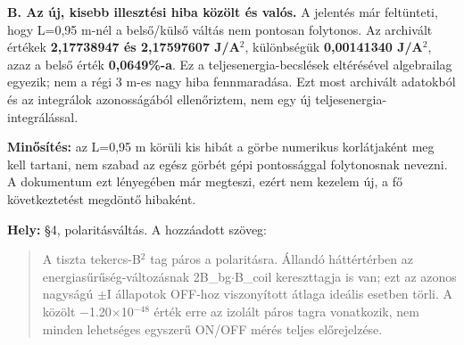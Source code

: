 \documentclass[10pt,a4paper]{article}
\begin{document}
{\begin{quote}
\end{quote}
\par

\newpage
{}\par\vspace{2pt}
\noindent{\color{navy}\rule{\linewidth}{0.4pt}}\par\vspace{2pt}
\textbf{B. Az új, kisebb illesztési hiba közölt és valós.} A jelentés már feltünteti, hogy L=0,95 m-nél a belső/külső váltás nem pontosan folytonos. Az archivált értékek \textbf{2,17738947 és 2,17597607 J/A$^2$}, különbségük \textbf{0,00141340 J/A$^2$}, azaz a belső érték \textbf{0,0649\%-a}. Ez a teljesenergia-becslések eltérésével algebrailag egyezik; nem a régi 3 m-es nagy hiba fennmaradása. Ezt most archivált adatokból és az integrálok azonosságából ellenőriztem, nem egy új teljesenergia-integrálással.
\par
\textbf{Minősítés:} az L=0,95 m körüli kis hibát a görbe numerikus korlátjaként meg kell tartani, nem szabad az egész görbét gépi pontossággal folytonosnak nevezni. A dokumentum ezt lényegében már megteszi, ezért nem kezelem új, a fő következtetést megdöntő hibaként.
\par
\vspace{2pt}\par\vspace{0.5pt}
\par
\textbf{Hely:} \S4, polaritásváltás. A hozzáadott szöveg:
\par
\begin{quote}\vspace{-3pt}
A tiszta tekercs-B$^2$ tag páros a polaritásra. Állandó háttértérben az energiasűrűség-változásnak 2B\_bg$\cdot$B\_coil kereszttagja is van; ezt az azonos nagyságú $\pm$I állapotok OFF-hoz viszonyított átlaga ideális esetben törli. A közölt $-$1.20$\times$10$^{-48}$ érték erre az izolált páros tagra vonatkozik, nem minden lehetséges egyszerű ON/OFF mérés teljes előrejelzése.


\end{quote}}
\end{document}
